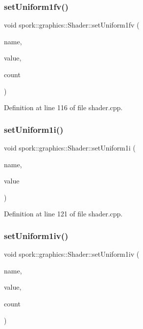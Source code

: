 \subsubsection{\texorpdfstring{set\+Uniform1fv()}{setUniform1fv()}}
{\footnotesize\ttfamily void spork\+::graphics\+::\+Shader\+::set\+Uniform1fv (\begin{DoxyParamCaption}\item[{const G\+Lchar $\ast$}]{name,  }\item[{float $\ast$}]{value,  }\item[{int}]{count }\end{DoxyParamCaption})}



Definition at line 116 of file shader.\+cpp.

\mbox{\label{classspork_1_1graphics_1_1_shader_a589ba3d50686c9ce540db9e974b5fc70}} 
\subsubsection{\texorpdfstring{set\+Uniform1i()}{setUniform1i()}}
{\footnotesize\ttfamily void spork\+::graphics\+::\+Shader\+::set\+Uniform1i (\begin{DoxyParamCaption}\item[{const G\+Lchar $\ast$}]{name,  }\item[{int}]{value }\end{DoxyParamCaption})}



Definition at line 121 of file shader.\+cpp.

\mbox{\label{classspork_1_1graphics_1_1_shader_a843892caad17a39b03df675ae1fa268c}} 
\subsubsection{\texorpdfstring{set\+Uniform1iv()}{setUniform1iv()}}
{\footnotesize\ttfamily void spork\+::graphics\+::\+Shader\+::set\+Uniform1iv (\begin{DoxyParamCaption}\item[{const G\+Lchar $\ast$}]{name,  }\item[{int $\ast$}]{value,  }\item[{int}]{count }\end{DoxyParamCaption})}



